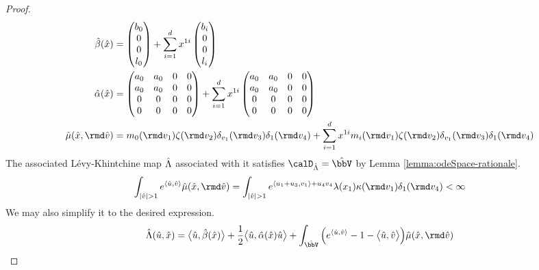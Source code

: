 \begin{proof}
  \begin{align*}
    \hat\affDrift(\hat\stateVar) &= \begin{pmatrix} \affDriftPart_0 \\ 0 \\ 0 \\ \affIntPart_0 \end{pmatrix} + \sum_{i=1}^d \stateVar^{1i} \begin{pmatrix} \affDriftPart_i \\ 0 \\ 0 \\ \affIntPart_i \end{pmatrix} \\
    \hat\affDiff(\hat\stateVar) &=  \begin{pmatrix} \affDiffPart_0 & \affDiffPart_0 & 0 & 0 \\ \affDiffPart_0 & \affDiffPart_0 & 0 & 0 \\ 0 & 0 & 0 & 0 \\ 0 & 0 & 0 & 0 \end{pmatrix} + \sum_{i=1}^d \stateVar^{1i} \begin{pmatrix} \affDiffPart_0 & \affDiffPart_0 & 0 & 0 \\ \affDiffPart_0 & \affDiffPart_0 & 0 & 0 \\ 0 & 0 & 0 & 0 \\ 0 & 0 & 0 & 0 \end{pmatrix} \\
    \hat\affJump(\hat\stateVar, \rmd\hat\markVar) &= \affJumpPart_0(\rmd\markVar_1)\zeta(\rmd\markVar_2)\delta_{\markVar_1}(\rmd\markVar_3)\delta_1(\rmd\markVar_4) + \sum_{i=1}^d \stateVar^{1i}  \affJumpPart_i(\rmd\markVar_1)\zeta(\rmd\markVar_2)\delta_{\markVar_1}(\rmd\markVar_3)\delta_1(\rmd\markVar_4)
  \end{align*}
  The associated L\'evy-Khintchine map $\hat{\Lambda}$ associated with it satisfies $\odeSpaceJoint = \hat\vecSpace$ by Lemma \ref{lemma:odeSpace-rationale}.
  \begin{equation*}
    \int_{|\hat\markVar|>1} e^\prj{\hat\momentVar}{\hat\markVar} \hat\affJump(\hat\stateVar, \rmd\hat\markVar)
    = \int_{|\hat\markVar|>1} e^{\prj{\momentVar_1+\momentVar_3}{\markVar_1} + \momentVar_4\markVar_4} \affInt(\stateVar_1) \affDist(\rmd\markVar_1)\delta_1(\rmd\markVar_4) < \infty
  \end{equation*}
  We may also simplify it to the desired expression.
  \begin{align*}
    \hat\ode(\hat\momentVar, \hat\stateVar) 
    &= \bprj{\hat\momentVar}{\hat\affDrift(\hat\stateVar)} + \frac12\bprj{\hat\momentVar}{\hat\affDiff(\hat\stateVar)\hat\momentVar} + \int_{\hat\vecSpace} \Big( e^\prj{\hat\momentVar}{\hat\markVar} - 1 - \bprj{\hat\momentVar}{\hat\markVar} \Big) \hat\affJump(\hat\stateVar, \rmd\hat\markVar) \\

\end{align*}
\end{proof}
